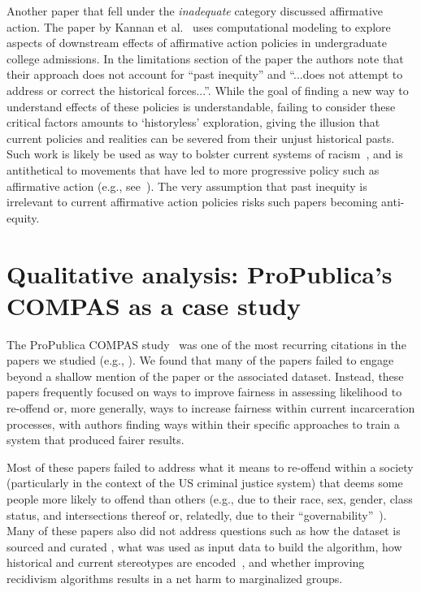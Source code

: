 \documentclass[manuscript]{acmart}
\begin{document}
Another paper that fell under the \textit{inadequate} category discussed affirmative action.  
The paper by Kannan et al.~\cite{kannan2019affirmativeaction} uses computational modeling to explore aspects of downstream effects of affirmative action policies in undergraduate college admissions. In the limitations section of the paper the authors note that their approach does not account for ``past inequity'' and ``...does not attempt to address or correct the historical forces...''. While the goal of finding a new way to understand effects of these policies is understandable, failing to consider these critical factors  amounts to `historyless' %
exploration, giving the illusion that current policies and realities can be severed from their unjust historical pasts. Such work is likely be used as way to bolster current systems of racism~\cite{bonilla2015structureracism}, and %
is %
antithetical to %
movements that have led to more progressive policy such as affirmative action (e.g., see~\cite{mlk1968}). The very assumption that past inequity is irrelevant to current affirmative action policies risks such papers becoming anti-equity. %

\section{Qualitative analysis: ProPublica's COMPAS as a case study}
\label{sect:qual}
The ProPublica  COMPAS study~\cite{angwin2016machine} was one of the most recurring citations in the papers we studied (e.g., \cite{kim2019multiaccuracy, matthews2019righconfront, gilbert2019epistemic, mcnamara2019equalized, mishler2019modelingrisk, srivastava2018composablebias, vasconcelos2019epistemological, kalyanakrishnan2018aiindia, goel2018mlconvex, couldechova2018child, buolamwini2018gender, taskesen21compas, fogliato21compas, krafft21compas}). We found that many of the papers failed to engage beyond a shallow mention of the paper or the associated dataset. Instead, these papers frequently focused on ways to improve fairness in assessing likelihood to re-offend or, more generally, ways to increase fairness within current incarceration processes, with authors finding ways within their specific approaches to train a system that produced fairer results.

Most of these papers %
failed to address what it means to re-offend within a society (particularly in the context of the US criminal justice system) that deems some people more likely to offend than others (e.g., due to their race, sex, gender, class status, and intersections thereof or, relatedly, due to their ``governability''~\cite{quan2017demliving}). Many of these papers also did not address %
questions such as how the dataset is sourced and curated%
, what was used as input data to build the algorithm, how historical and current stereotypes are encoded~\cite{benjamin2019race,birhane2021large}, and whether improving recidivism algorithms %
results in a net harm to marginalized groups. 
\end{document}
